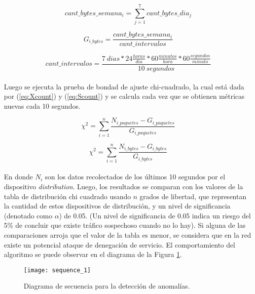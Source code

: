 \begin{equation}
	cant\_bytes\_semana_i={\sum_{j=1}^7 cant\_bytes\_dia_{j}}
\end{equation}

\begin{equation}\label{eq:gisize}
	G_{i\_bytes}={\frac{cant\_bytes\_semana_i}{cant\_intervalos}}
\end{equation}

\begin{equation}\label{eq:intervalo}
  cant\_intervalos=\frac{7\ dias * 24\frac{horas}{dia} * 60\frac{minutos}{hora} * 60\frac{segundos}{minuto}}{10 \ segundos}
\end{equation} \\

Luego se ejecuta la prueba de bondad de ajuste chi-cuadrado, la cual está dada
por (\ref{eq:Xcount}) y (\ref{eq:Scount}) y se calcula cada vez que se obtienen
métricas nuevas cada 10 segundos.

\begin{equation}\label{eq:Xcount}
	\chi^2 = {\sum_{i=1}^{n}   \frac{N_{i\_paquetes}-G_{i\_paquetes}}{G_{i\_paquetes}}}
\end{equation}

\begin{equation}\label{eq:Scount}
	\chi^2 = {\sum_{i=1}^{n}   \frac{N_{i\_bytes}-G_{i\_bytes}}{G_{i\_bytes}}}
\end{equation}\\


En donde \(N_{i}\) son los datos recolectados de los últimos 10 segundos por el
dispositivo \textit{distribution}. Luego, los resultados se comparan con los
valores de la tabla de distribución chi cuadrado usando \textbf{\(n\)} grados de
libertad, que representan la cantidad de estos dispositivos de distribución, y
un nivel de significancia (denotado como \(\alpha\)) de 0.05. (Un nivel de
significancia de 0.05 indica un riesgo del 5\% de concluir que existe tráfico
sospechoso cuando no lo hay). Si alguna de las comparaciones arroja que el valor
de la tabla es menor, se considera que en la red existe un potencial ataque de
denegación de servicio. El comportamiento del algoritmo se puede observar en el
diagrama de la Figura \ref{fig:diagram2}.

\begin{figure}[H]
	\centering 
	\texttt{[image: sequence\_1]}
	\caption{Diagrama de secuencia para la detección de anomalías.}
	\label{fig:diagram2}
\end{figure}

